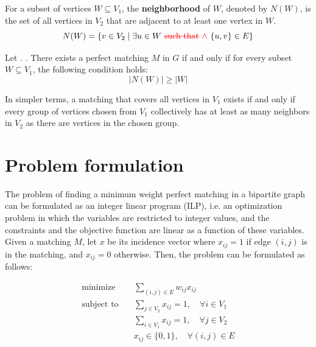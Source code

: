 \begin{definition}[Neighborhood] \label{def:neighborhood}
For a subset of vertices $W \subseteq V_1$, the \textbf{neighborhood} of $W$, denoted by $N(W)$, is the set of all vertices in $V_2$ that are adjacent to at least one vertex in $W$.
\[ N(W) = \{ v \in V_2 \mid \exists u \in W \text{ \draft{\sout{such that} $\land$} } \{u, v\} \in E \} \]
\end{definition}

\begin{theorem} \label{thm:halls_marriage_theorem}
Let . .
There exists a perfect matching $M$ in $G$ if and only if for every subset $W \subseteq V_1$, the following condition holds:
\[ |N(W)| \geq |W| \]
\end{theorem}

In simpler terms, a matching that covers all vertices in $V_1$ exists if and only if every group of vertices chosen from $V_1$ collectively has at least as many neighbors in $V_2$ as there are vertices in the chosen group.

\section{Problem formulation}
The problem of finding a minimum weight perfect matching in a bipartite graph can be formulated as an integer linear program (ILP), i.e. an optimization problem in which the variables are restricted to integer values, and the constraints and the objective function are linear as a function of these variables. Given a matching $M$, let $x$ be its incidence vector where $x_{ij} = 1$ if edge $(i, j)$ is in the matching, and $x_{ij} = 0$ otherwise. Then, the problem can be formulated as follows:

\begin{equation}
    \begin{aligned}
        \text{minimize} \quad & \sum_{(i, j) \in E} w_{ij} x_{ij} \\
        \text{subject to} \quad & \sum_{j \in V_2} x_{ij} = 1, \quad \forall i \in V_1 \\
        & \sum_{i \in V_1} x_{ij} = 1, \quad \forall j \in V_2 \\
        & x_{ij} \in \{0, 1\}, \quad \forall (i, j) \in E
    \end{aligned}
\end{equation}

